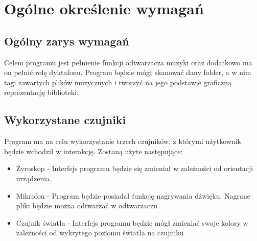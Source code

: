 	\newpage
\section{Ogólne określenie wymagań}		%

\subsection{Ogólny zarys wymagań}

Celem programu jest pełnienie funkcji odtwarzacza muzyki oraz dodatkowo ma on pełnić rolę dyktafonu. Program będzie mógł skanować dany folder, a w nim tagi zawartych plików muzycznych i tworzyć na jego podstawie graficzną reprezentację biblioteki. 

\subsection{Wykorzystane czujniki}

Program ma na celu wykorzystanie trzech czujników, z którymi użytkownik będzie wchodził w interakcję. Zostaną użyte następujące:

\begin{itemize}
	\item Żyroskop - Interfejs programu będzie się zmieniał w zależności od orientacji urządzenia. 
	
	\item Mikrofon - Program będzie posiadał funkcję nagrywania dźwięku. Nagrane pliki będzie można odtwarzać w odtwarzaczu

	\item Czujnik światła - Interfejs programu będzie mógł zmieniać swoje kolory w zależności od wykrytego poziomu światła na czujniku
\end{itemize}

